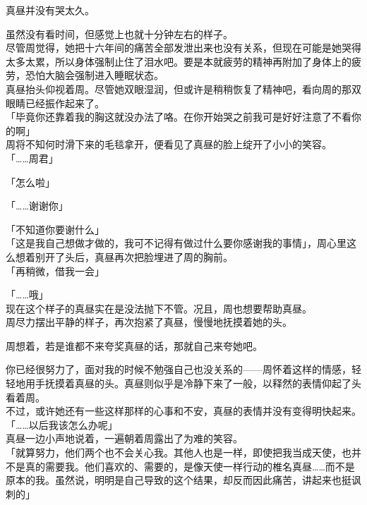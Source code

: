 真昼并没有哭太久。

虽然没有看时间，但感觉上也就十分钟左右的样子。\\

尽管周觉得，她把十六年间的痛苦全部发泄出来也没有关系，但现在可能是她哭得太多太累，所以身体强制止住了泪水吧。要是本就疲劳的精神再附加了身体上的疲劳，恐怕大脑会强制进入睡眠状态。\\

真昼抬头仰视着周。尽管她双眼湿润，但或许是稍稍恢复了精神吧，看向周的那双眼睛已经振作起来了。\\

「毕竟你还靠着我的胸这就没办法了咯。在你开始哭之前我可是好好注意了不看你的啊」\\

周将不知何时滑下来的毛毯拿开，便看见了真昼的脸上绽开了小小的笑容。\\

「……周君」

「怎么啦」

「……谢谢你」

「不知道你要谢什么」\\

「这是我自己想做才做的，我可不记得有做过什么要你感谢我的事情」，周心里这么想着别开了头后，真昼再次把脸埋进了周的胸前。\\

「再稍微，借我一会」

「……哦」\\

现在这个样子的真昼实在是没法抛下不管。况且，周也想要帮助真昼。\\

周尽力摆出平静的样子，再次抱紧了真昼，慢慢地抚摸着她的头。

周想着，若是谁都不来夸奖真昼的话，那就自己来夸她吧。

你已经很努力了，面对我的时候不勉强自己也没关系的——周怀着这样的情感，轻轻地用手抚摸着真昼的头。真昼则似乎是冷静下来了一般，以释然的表情仰起了头看着周。\\

不过，或许她还有一些这样那样的心事和不安，真昼的表情并没有变得明快起来。\\

「……以后我该怎么办呢」\\

真昼一边小声地说着，一遍朝着周露出了为难的笑容。\\

「就算努力，他们两个也不会关心我。其他人也是一样，即使把我当成天使，也并不是真的需要我。他们喜欢的、需要的，是像天使一样行动的椎名真昼……而不是原本的我。虽然说，明明是自己导致的这个结果，却反而因此痛苦，讲起来也挺讽刺的」\\

